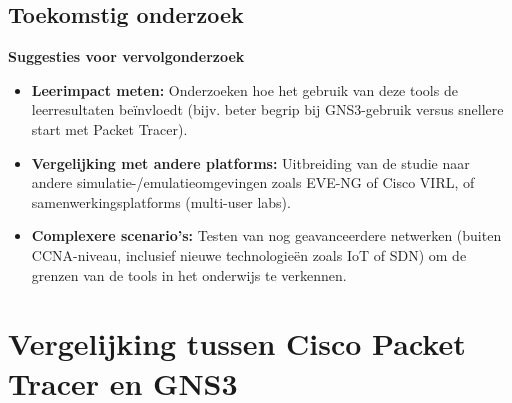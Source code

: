 \documentclass[a0,portrait]{hogent-poster}
\begin{document}
\begin{multicols}{2}
\section{Toekomstig onderzoek}

\textbf{Suggesties voor vervolgonderzoek} \\
\begin{itemize}
    \item \textbf{Leerimpact meten:} Onderzoeken hoe het gebruik van deze tools de leerresultaten beïnvloedt (bijv. beter begrip bij GNS3-gebruik versus snellere start met Packet Tracer).
    \item \textbf{Vergelijking met andere platforms:} Uitbreiding van de studie naar andere simulatie-/emulatieomgevingen zoals EVE-NG of Cisco VIRL, of samenwerkingsplatforms (multi-user labs).
    \item \textbf{Complexere scenario’s:} Testen van nog geavanceerdere netwerken (buiten CCNA-niveau, inclusief nieuwe technologieën zoals IoT of SDN) om de grenzen van de tools in het onderwijs te verkennen.
\end{itemize}


\end{multicols}


\section*{Vergelijking tussen Cisco Packet Tracer en GNS3}


\vspace{0.5cm}
\end{document}
